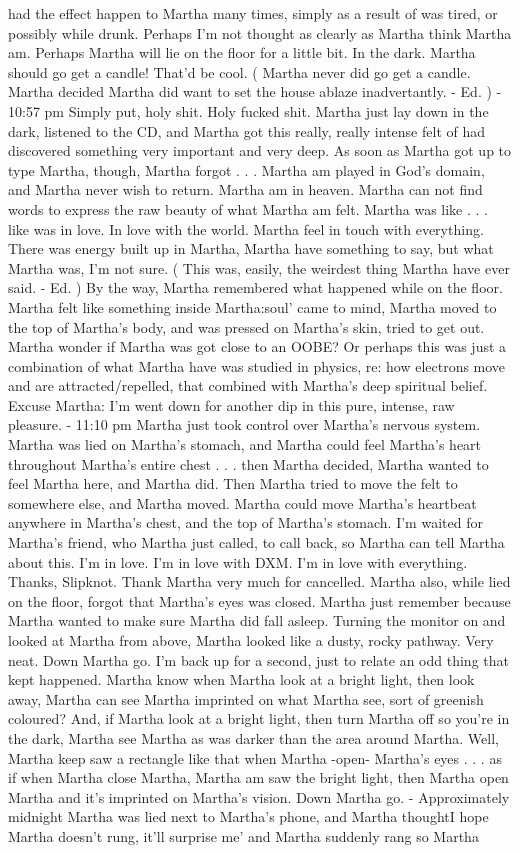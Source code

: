 \documentclass[12pt]{book}
\begin{document}
had the effect happen to Martha many times, simply as a result of was tired, or possibly while drunk. Perhaps I'm not thought as clearly as Martha think Martha am. Perhaps Martha will lie on the floor for a little bit. In the dark. Martha should go get a candle! That'd be cool. ( Martha never did go get a candle. Martha decided Martha did want to set the house ablaze inadvertantly. - Ed. ) - 10:57 pm Simply put, holy shit. Holy fucked shit. Martha just lay down in the dark, listened to the CD, and Martha got this really, really intense felt of had discovered something very important and very deep. As soon as Martha got up to type Martha, though, Martha forgot . . .  Martha am played in God's domain, and Martha never wish to return. Martha am in heaven. Martha can not find words to express the raw beauty of what Martha am felt. Martha was like . . .  like was in love. In love with the world. Martha feel in touch with everything. There was energy built up in Martha, Martha have something to say, but what Martha was, I'm not sure. ( This was, easily, the weirdest thing Martha have ever said. - Ed. ) By the way, Martha remembered what happened while on the floor. Martha felt like something inside Martha:soul' came to mind, Martha moved to the top of Martha's body, and was pressed on Martha's skin, tried to get out. Martha wonder if Martha was got close to an OOBE? Or perhaps this was just a combination of what Martha have was studied in physics, re: how electrons move and are attracted/repelled, that combined with Martha's deep spiritual belief. Excuse Martha: I'm went down for another dip in this pure, intense, raw pleasure. - 11:10 pm Martha just took control over Martha's nervous system. Martha was lied on Martha's stomach, and Martha could feel Martha's heart throughout Martha's entire chest . . .  then Martha decided, Martha wanted to feel Martha here, and Martha did. Then Martha tried to move the felt to somewhere else, and Martha moved. Martha could move Martha's heartbeat anywhere in Martha's chest, and the top of Martha's stomach. I'm waited for Martha's friend, who Martha just called, to call back, so Martha can tell Martha about this. I'm in love. I'm in love with DXM. I'm in love with everything. Thanks, Slipknot. Thank Martha very much for cancelled. Martha also, while lied on the floor, forgot that Martha's eyes was closed. Martha just remember because Martha wanted to make sure Martha did fall asleep. Turning the monitor on and looked at Martha from above, Martha looked like a dusty, rocky pathway. Very neat. Down Martha go. I'm back up for a second, just to relate an odd thing that kept happened. Martha know when Martha look at a bright light, then look away, Martha can see Martha imprinted on what Martha see, sort of greenish coloured? And, if Martha look at a bright light, then turn Martha off so you're in the dark, Martha see Martha as was darker than the area around Martha. Well, Martha keep saw a rectangle like that when Martha -open- Martha's eyes . . .  as if when Martha close Martha, Martha am saw the bright light, then Martha open Martha and it's imprinted on Martha's vision. Down Martha go. - Approximately midnight Martha was lied next to Martha's phone, and Martha thoughtI hope Martha doesn't rung, it'll surprise me' and Martha suddenly rang so Martha 
\end{document}
